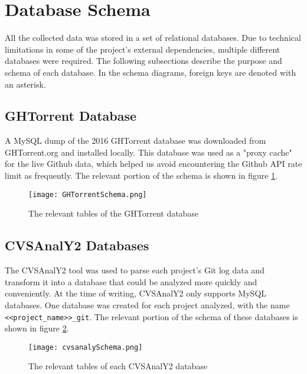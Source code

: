  

\section{Database Schema}
All the collected data was stored in a set of relational databases. Due to technical limitations in some of the project's external dependencies, multiple different databases were required. The following subsections describe the purpose and schema of each database. In the schema diagrams, foreign keys are denoted with an asterisk.
\subsection{GHTorrent Database}
A MySQL dump of the 2016 GHTorrent database was downloaded from GHTorrent.org and installed locally. This database was used as a "proxy cache" for the live Github data, which helped us  
avoid encountering the Github API rate limit as frequently. The relevant portion of the schema is shown in figure \ref{fig:ghtorrentSchema}.
\begin{figure}
	\texttt{[image: GHTorrentSchema.png]}
	\centering
	\caption{The relevant tables of the GHTorrent database }
	\label{fig:ghtorrentSchema}
\end{figure}
\subsection{CVSAnalY2 Databases}
 The CVSAnalY2 tool\cite{cvsanaly} was used to parse each project's Git log data and transform it into a database that could be analyzed more quickly and conveniently. At the time of writing, CVSAnalY2 only supports MySQL databases. One database was created for each project analyzed, with the name \verb|<<project_name>>_git|. The relevant portion of the schema of these databases is shown in figure \ref{fig:cvsanalySchema}.
\begin{figure}
	\texttt{[image: cvsanalySchema.png]}
	\centering
	\caption{The relevant tables of each CVSAnalY2 database}
	\label{fig:cvsanalySchema}
\end{figure}
